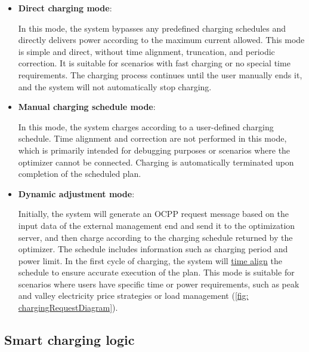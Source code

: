 \documentclass[
	english,
	ruledheaders=section,%
	class=report,%
	thesis={type=Report},%
	accentcolor=9c,%
	custommargins=true,%
	marginpar=false,%
	parskip=half-,%
	fontsize=11pt,%
	logofile={img/tuda_logo.pdf}, %
]{tudapub}
\begin{document}
    \begin{itemize}
        \item \textbf{Direct charging mode}:
        
        In this mode, the system bypasses any predefined charging schedules and directly delivers power according to the maximum current allowed. This mode is simple and direct, without time alignment, truncation, and periodic correction. It is suitable for scenarios with fast charging or no special time requirements. The charging process continues until the user manually ends it, and the system will not automatically stop charging.

        \item \textbf{Manual charging schedule mode}:
        
        In this mode, the system charges according to a user-defined charging schedule. Time alignment and correction are not performed in this mode, which is primarily intended for debugging purposes or scenarios where the optimizer cannot be connected. Charging is automatically terminated upon completion of the scheduled plan.
        
        \item \textbf{Dynamic adjustment mode}:
        
        Initially, the system will generate an \ac{OCPP} request message based on the input data of the external management end and send it to the optimization server, and then charge according to the charging schedule returned by the optimizer. The schedule includes information such as charging period and power limit. In the first cycle of charging, the system will \hyperref[subsec: timeSynchronAndSplit]{time align} the schedule to ensure accurate execution of the plan. This mode is suitable for scenarios where users have specific time or power requirements, such as peak and valley electricity price strategies or load management (\autoref{fig: chargingRequestDiagram}).
    \end{itemize}


\subsection{Smart charging logic}
\label{subsec: chargeLogic}
\end{document}
